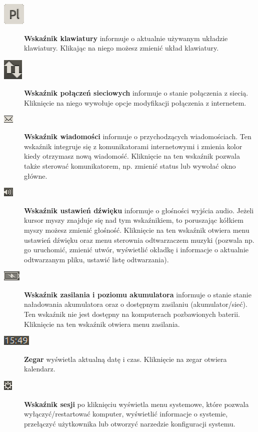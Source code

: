 \begin{description}
\item[\includegraphics{images/unity_wskaznik_klawiatura.png}]\textbf{Wskaźnik klawiatury} informuje o aktualnie używanym układzie klawiatury. Klikając na niego możesz zmienić układ klawiatury.
\item[\includegraphics{images/unity_wskaznik_siec.png}]\textbf{Wskaźnik połączeń sieciowych} informuje o stanie połączenia z siecią. Kliknięcie na niego wywołuje opcje modyfikacji połączenia z internetem.
\item[\includegraphics{images/unity_wskaznik_wiadomosci.png}]\textbf{Wskaźnik wiadomości} informuje o przychodzących wiadomościach. Ten wskaźnik integruje się z komunikatorami internetowymi i zmienia kolor kiedy otrzymasz nową wiadomość. Kliknięcie na ten wskaźnik pozwala także sterować komunikatorem, np. zmienić status lub wywołać okno główne.
\item[\includegraphics{images/unity_wskaznik_dzwiek.png}]\textbf{Wskaźnik ustawień dźwięku} informuje o głośności wyjścia audio. Jeżeli kursor myszy znajduje się nad tym wskaźnikiem, to poruszając kółkiem myszy możesz zmienić głośność. Kliknięcie na ten wskaźnik otwiera menu ustawień dźwięku oraz menu sterownia odtwarzaczem muzyki (pozwala np. go uruchomić, zmienić utwór, wyświetlić okładkę i informacje o aktualnie odtwarzanym pliku, ustawić listę odtwarzania).
\item[\includegraphics{images/unity_wskaznik_zasilanie.png}]\textbf{Wskaźnik zasilania i poziomu akumulatora} informuje o stanie stanie naładowania akumulatora oraz o dostępnym zasilaniu (akumulator/sieć). Ten wskaźnik nie jest dostępny na komputerach pozbawionych baterii. Kliknięcie na ten wskaźnik otwiera menu zasilania.
\item[\includegraphics{images/unity_wskaznik_zegar.png}]\textbf{Zegar} wyświetla aktualną datę i czas. Kliknięcie na zegar otwiera kalendarz.
\item[\includegraphics{images/unity_wskaznik_system.png}]\textbf{Wskaźnik sesji} po kliknięciu wyświetla menu systemowe, które pozwala wyłączyć/restartować komputer, wyświetlić informacje o systemie, przełączyć użytkownika lub otworzyć narzedzie konfiguracji systemu.
\end{description}
\clearpage


